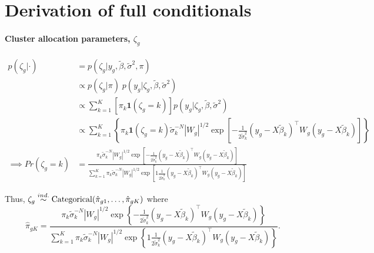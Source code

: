 \section{Derivation of full conditionals}
\small
\paragraph{Cluster allocation parameters, $\zeta_g$}
\begin{align*}
p(\zeta_g|\cdot) & = p(\zeta_g|y_g, \tilde{\beta}, \tilde{\sigma}^2, \pi)\\
& \propto  p(\zeta_g|\pi)\; p(y_g|\zeta_g, \tilde{\beta}, \tilde{\sigma}^2)\\
& \propto  \sum_{k=1}^K \left[ \pi_k \bm{1}(\zeta_g=k)\right] p(y_g|\zeta_g,\tilde{\beta},\tilde{\sigma}^2)\\
& \propto \sum_{k=1}^K \left\{ \pi_k \bm{1}(\zeta_g=k)  \tilde{\sigma}_k^{-N} |W_g|^{1/2} \exp \left[ -\frac{1}{2\tilde{\sigma}^2_k} \left( y_g - X\tilde{\beta}_k \right)^\top W_g \left( y_g - X\tilde{\beta}_k \right) \right]\right\}\\
\implies Pr(\zeta_g=k) & = \frac{\pi_k \tilde{\sigma}_k^{-N} |W_g|^{1/2} \exp \left[ -\frac{1}{2\tilde{\sigma}^2_k} \left( y_g - X\tilde{\beta}_k \right)^\top W_g \left( y_g - X\tilde{\beta}_k \right) \right]}{\sum_{k=1}^K \pi_k \tilde{\sigma}_k^{-N} |W_g|^{1/2} \exp \left[ 1\frac{1}{2\tilde{\sigma}^2_k} \left( y_g - X\tilde{\beta}_k \right)^\top W_g \left( y_g - X\tilde{\beta}_k \right) \right]}
\end{align*}

Thus, $\zeta_g \stackrel{ind.}{\sim} \operatorname{Categorical}(\hat{\pi}_{g1},\ldots,\hat{\pi}_{gK})$ where
\begin{equation*}
\hat{\pi}_{gK} = \frac{\pi_k \tilde{\sigma}_k^{-N} |W_g|^{1/2} \exp \left\{ -\frac{1}{2\tilde{\sigma}^2_k} \left( y_g - X\tilde{\beta}_k \right)^\top W_g \left( y_g - X\tilde{\beta}_k \right) \right\}}{\sum_{k=1}^K \pi_k \tilde{\sigma}_k^{-N} |W_g|^{1/2} \exp \left\{ 1\frac{1}{2\tilde{\sigma}^2_k} \left( y_g - X\tilde{\beta}_k \right)^\top W_g \left( y_g - X\tilde{\beta}_k \right) \right\}}.
\end{equation*}

